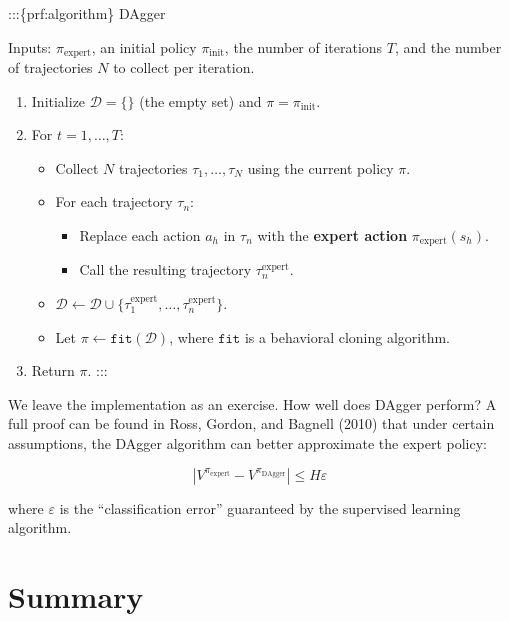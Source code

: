 \documentclass[
  letterpaper,
  DIV=11,
  numbers=noendperiod]{scrreprt}
\providecommand{\tightlist}{%
  \setlength{\itemsep}{0pt}\setlength{\parskip}{0pt}}\usepackage{longtable,booktabs,array}
\theoremstyle{plain}
\theoremstyle{plain}
\theoremstyle{definition}
\theoremstyle{definition}
\theoremstyle{remark}
\begin{document}
:::\{prf:algorithm\} DAgger

Inputs: \(\pi_{\text{expert}}\), an initial policy
\(\pi_{\text{init}}\), the number of iterations \(T\), and the number of
trajectories \(N\) to collect per iteration.

\begin{enumerate}
\def\labelenumi{\arabic{enumi}.}
\tightlist
\item
  Initialize \(\mathcal{D} = \{\}\) (the empty set) and
  \(\pi = \pi_{\text{init}}\).
\item
  For \(t = 1, \dots, T\):

  \begin{itemize}
  \tightlist
  \item
    Collect \(N\) trajectories \(\tau_1, \dots, \tau_N\) using the
    current policy \(\pi\).
  \item
    For each trajectory \(\tau_n\):

    \begin{itemize}
    \tightlist
    \item
      Replace each action \(a_h\) in \(\tau_n\) with the \textbf{expert
      action} \(\pi_{\text{expert}}(s_h)\).
    \item
      Call the resulting trajectory \(\tau^{\text{expert}}_n\).
    \end{itemize}
  \item
    \(\mathcal{D} \gets \mathcal{D} \cup \{ \tau^{\text{expert}}_1, \dots, \tau^{\text{expert}}_n \}\).
  \item
    Let \(\pi \gets \texttt{fit}(\mathcal{D})\), where \(\texttt{fit}\)
    is a behavioral cloning algorithm.
  \end{itemize}
\item
  Return \(\pi\). :::
\end{enumerate}

We leave the implementation as an exercise. How well does DAgger
perform? A full proof can be found in Ross, Gordon, and Bagnell (2010)
that under certain assumptions, the DAgger algorithm can better
approximate the expert policy:

\[
|V^{\pi_{\text{expert}}} - V^{\pi_{\text{DAgger}}}| \le H \varepsilon
\]

where \(\varepsilon\) is the ``classification error'' guaranteed by the
supervised learning algorithm.

\section{Summary}\label{summary-5}
\end{document}
